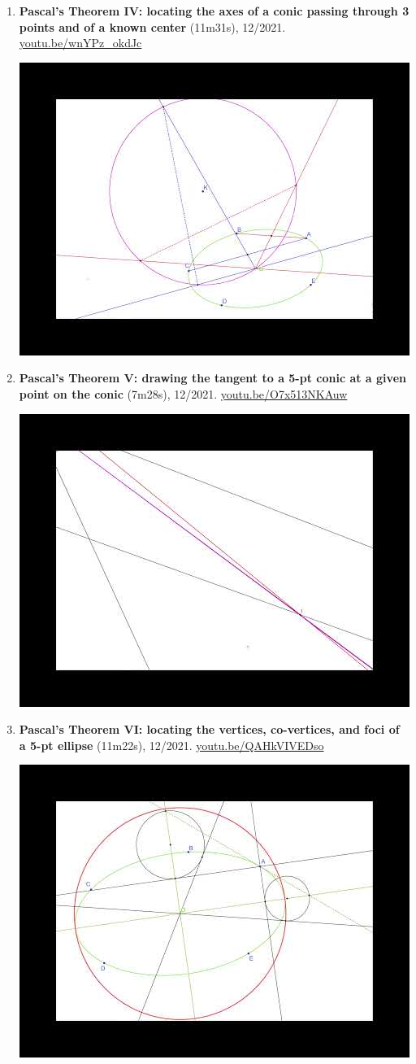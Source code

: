 \documentclass[12pt]{article}
\begin{document}
\begin{enumerate}[resume]
% 
\item \textbf{Pascal's Theorem IV: locating the axes of a conic passing through 3 points and of a known center} (11m31s), 12/2021. \href{https://youtu.be/wnYPz_okdJc}{\url{youtu.be/wnYPz\_okdJc}}
\begin{center}\includegraphics[width=.5\textwidth]{pics/wnYPz_okdJc.jpg}\end{center}
% 
\item \textbf{Pascal's Theorem V: drawing the tangent to a 5-pt conic at a given point on the conic} (7m28s), 12/2021. \href{https://youtu.be/O7x513NKAuw}{\url{youtu.be/O7x513NKAuw}}
\begin{center}\includegraphics[width=.5\textwidth]{pics/O7x513NKAuw.jpg}\end{center}
% 
\item \textbf{Pascal's Theorem VI: locating the vertices, co-vertices, and foci of a 5-pt ellipse} (11m22s), 12/2021. \href{https://youtu.be/QAHkVIVEDso}{\url{youtu.be/QAHkVIVEDso}}
\begin{center}\includegraphics[width=.5\textwidth]{pics/QAHkVIVEDso.jpg}\end{center}
% 
\end{enumerate}
\end{document}
